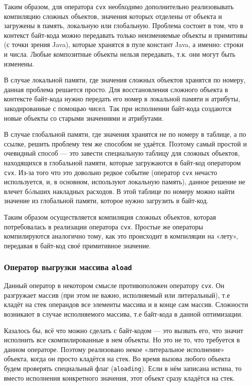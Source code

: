 \documentclass[14pt]{extarticle}
\begin{document}
	Таким образом, для оператора \texttt{cvx} необходимо дополнительно реализовывать  компиляцию сложных объектов, значения которых отделены от объекта и загружены в память, локальную или глобальную. Проблема состоит в том, что в контекст байт-кода можно передавать только неизменяемые объекты и примитивы (с точки зрения Java), которые хранятся в пуле констант Java, а именно: строки и числа. Любые композитные объекты нельзя передавать, т.к. они могут быть изменены.
	
	В случае локальной памяти, где значения сложных объектов хранятся по номеру, данная проблема решается просто. Для восстановления сложного объекта в контексте байт-кода нужно передать его номер в локальной памяти и атрибуты, закодированные с помощью чисел. Так при исполнении байт-кода создаются новые объекты со старыми значениями и атрибутами.
	
	В случае глобальной памяти, где значения хранятся не по номеру в таблице, а по ссылке, решить проблему тем же способом не удаётся. Поэтому самый простой и очевидный способ --- это завести специальную таблицу для сложных объектов, находящихся в глобальной памяти, которые загружаются в байт-код оператором \texttt{cvx}. Из-за того что это довольно редкое событие (оператор \texttt{cvx} нечасто используется, и, в основном, используют локальную память), данное решение не влечет бóльших накладных расходов. В этой таблице по номеру можно найти значение из глобальной памяти, которое нужно загрузить в байт-код.
	
	Таким образом осуществляется компиляция сложных объектов, которая потребовалась в реализации оператора \texttt{cvx}. Простые же операторы компилируются аналогично тому, как это происходит в компиляции на «лету», передавая в байт-код своё примитивное значение.
	\subsubsection*{Оператор выгрузки массива \texttt{aload}}
	Данный оператор в некотором смысле противоположен оператору \texttt{cvx}. Он разгружает массив (при этом не важно, исполняемый или литеральный), т.е кладёт на стек операндов все элементы массива и в конце сам массив. Сложности возникают в случае исполняемого массива, т.е байт-кода в данной оптимизации.
	
	Казалось бы, всё что можно сделать с байт-кодом --- это вызвать его, что значит исполнить все скомпилированные в нем объекты. Но это не то, что требуется в данном операторе. Поэтому реализовано некое «литеральное исполнение» объекта, когда он просто кладётся на стек. Во время вызова любого объекта будем проверять специальный флаг (\texttt{aloading}). Если  в нём записана истина, то вместо исполнения конкретного значения, этот объект сразу кладётся на стек.
	
\end{document}
